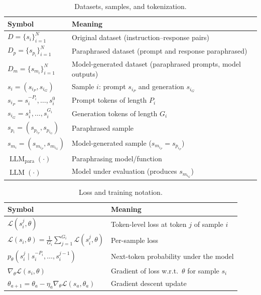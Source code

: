 \begin{table}[htb!]
    \centering
    \small
    \begin{tabular}{ll}
        \textbf{Symbol} & \textbf{Meaning} \\
        \hline
        $D=\{s_i\}_{i=1}^{N}$ & Original dataset (instruction–response pairs) \\
        $D_p=\{s_{p_i}\}_{i=1}^{N}$ & Paraphrased dataset (prompt and response paraphrased) \\
        $D_m=\{s_{m_i}\}_{i=1}^{N}$ & Model-generated dataset (paraphrased prompts, model outputs) \\
        $s_i=(s_{i_P}, s_{i_G})$ & Sample $i$: prompt $s_{i_P}$ and generation $s_{i_G}$ \\
        $s_{i_P}=s_i^{-P_i},\dots,s_i^{0}$ & Prompt tokens of length $P_i$ \\
        $s_{i_G}=s_i^{1},\dots,s_i^{G_i}$ & Generation tokens of length $G_i$ \\
        $s_{p_i}=(s_{p_{i_P}}, s_{p_{i_G}})$ & Paraphrased sample \\
        $s_{m_i}=(s_{m_{i_P}}, s_{m_{i_G}})$ & Model-generated sample ($s_{m_{i_P}}=s_{p_{i_P}}$) \\
        $\operatorname{LLM}_{\text{para}}(\cdot)$ & Paraphrasing model/function \\
        $\operatorname{LLM}(\cdot)$ & Model under evaluation (produces $s_{m_{i_G}}$) \\
    \end{tabular}
    \caption{Datasets, samples, and tokenization.}
    \label{tab:nomenclature-data}
\end{table}

\begin{table}[htb!]
    \centering
    \small
    \begin{tabular}{ll}
        \textbf{Symbol} & \textbf{Meaning} \\
        \hline
        $\mathcal{L}(s_i^j,\theta)$ & Token-level loss at token $j$ of sample $i$ \\
        $\mathcal{L}(s_i,\theta)=\frac{1}{G_i}\sum_{j=1}^{G_i}\mathcal{L}(s_i^j,\theta)$ & Per-sample loss \\
        $p_\theta(s_i^j \mid s_i^{-P_i},\dots,s_i^{j-1})$ & Next-token probability under the model \\
        $\nabla_{\theta}\mathcal{L}(s_i,\theta)$ & Gradient of loss w.r.t.\ $\theta$ for sample $s_i$ \\
        $\theta_{a+1}=\theta_a-\eta_a\nabla_{\theta}\mathcal{L}(s_a,\theta_a)$ & Gradient descent update \\
    \end{tabular}
    \caption{Loss and training notation.}
    \label{tab:nomenclature-loss}
\end{table}

